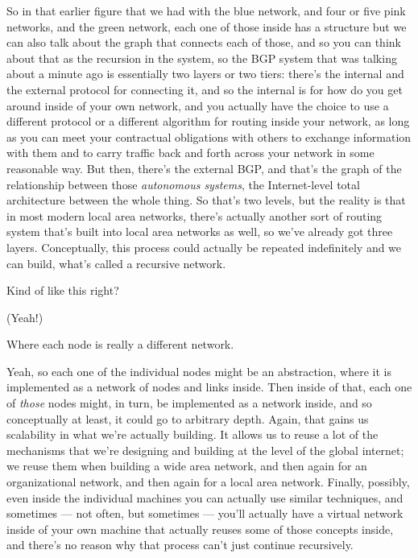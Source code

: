 \rrr So in that earlier figure that we had with the blue network, and four or five pink networks, and the green network, each one of those inside has a structure but we can also talk about the graph that connects each of those, and so you can think about that as the recursion in the system, so the BGP system that was talking about a minute ago is essentially two layers or two tiers: there's the internal and the external protocol for connecting it, and so the internal is for how do you get around inside of your own network, and you actually have the choice to use a different protocol or a different algorithm for routing inside your network, as long as you can meet your contractual obligations with others to exchange information with them and to carry traffic back and forth across your network in some reasonable way. But then, there's the external BGP, and that's the graph of the relationship between those \emph{autonomous systems}, the Internet-level total architecture between the whole thing. So that's two levels, but the reality is that in most modern local area networks, there's actually another sort of routing system that's built into local area networks as well, so we've already got three layers. Conceptually, this process could actually be repeated indefinitely and we can build, what's called a recursive network.

\mmm Kind of like this right? 

\rrr (Yeah!) 

\mmm Where each node is really a different network.

\rrr Yeah, so each one of the individual nodes might be an abstraction, where it is implemented as a network of nodes and links inside. Then inside of that, each one of \emph{those} nodes might, in turn, be implemented as a network inside, and so conceptually at least, it could go to arbitrary depth. Again, that gains us scalability in what we're actually building. It allows us to reuse a lot of the mechanisms that we're designing and building at the level of the global internet; we reuse them when building a wide area network, and then again for an organizational network, and then again for a local area network. Finally, possibly, even inside the individual machines you can actually use similar techniques, and sometimes --- not often, but sometimes --- you'll actually have a virtual network inside of your own machine that actually reuses some of those concepts inside, and there's no reason why that process can't just continue recursively.

